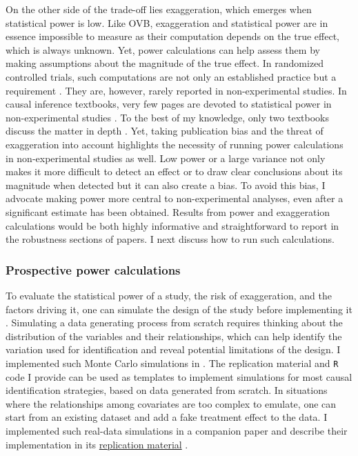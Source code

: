 \documentclass[usletter, 12pt]{article}
\begin{document}
			On the other side of the trade-off lies exaggeration, which emerges when statistical power is low. Like OVB, exaggeration and statistical power are in essence impossible to measure as their computation depends on the true effect, which is always unknown. Yet, power calculations can help assess them by making assumptions about the magnitude of the true effect. In randomized controlled trials, such computations are not only an established practice but a requirement \citep{duflo_using_2007, mcconnell_going_2025, athey_econometrics_2017}. They are, however, rarely reported in non-experimental studies. In causal inference textbooks, very few pages are devoted to statistical power in non-experimental studies \citep{angrist_mostly_2009, angrist_mastering_2014, imbens_causal_2015, cunningham_causal_2021}. To the best of my knowledge, only two textbooks discuss the matter in depth \citep{shadish_experimental_2002, huntington-klein_effect_2021}. Yet, taking publication bias and the threat of exaggeration into account highlights the necessity of running power calculations in non-experimental studies as well. Low power or a large variance not only makes it more difficult to detect an effect or to draw clear conclusions about its magnitude when detected but it can also create a bias. To avoid this bias, I advocate making power more central to non-experimental analyses, even after a significant estimate has been obtained. Results from power and exaggeration calculations would be both highly informative and straightforward to report in the robustness sections of papers. I next discuss how to run such calculations.
			
			\subsubsection{Prospective power calculations}
				
				To evaluate the statistical power of a study, the risk of exaggeration, and the factors driving it, one can simulate the design of the study before implementing it \citep{hill_bayesian_2011, gelman_regression_2020, black_simulated_2022}. Simulating a data generating process from scratch requires thinking about the distribution of the variables and their relationships, which can help identify the variation used for identification and reveal potential limitations of the design. I implemented such Monte Carlo simulations in . The replication material and \verb?R? code I provide can be used as templates to implement simulations for most causal identification strategies, based on data generated from scratch. In situations where the relationships among covariates are too complex to emulate, one can start from an existing dataset and add a fake treatment effect to the data. I implemented such real-data simulations in a companion paper and describe their implementation in its \href{https://vincentbagilet.github.io/inference_pollution/}{replication material} \citep{bagilet_accurate_2023}.
			 
\end{document}
